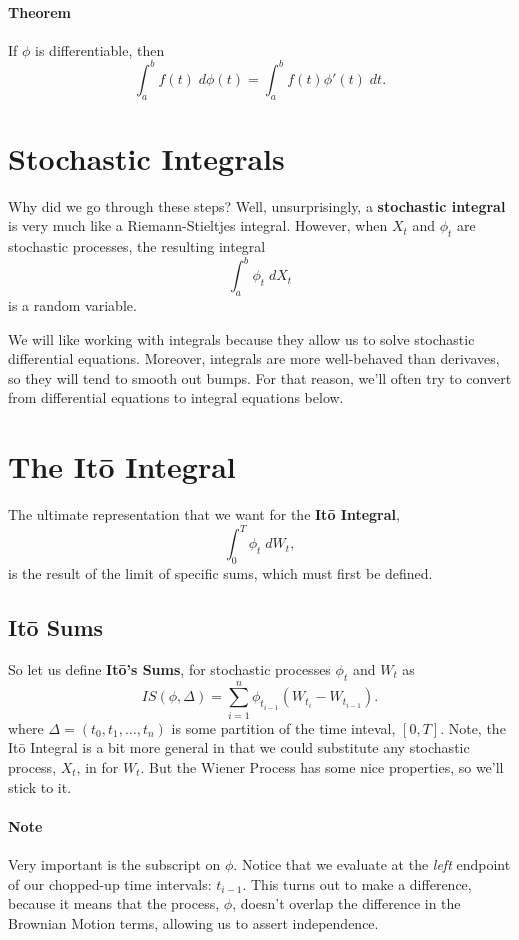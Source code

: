 \documentclass[a4paper,12pt]{scrartcl}
\begin{document}
\paragraph{Theorem} If $\phi$ is differentiable, then
   \[ \int_a^b f(t)\; d\phi(t) = \int^b_a f(t) \phi'(t) \;dt.\]

\section{Stochastic Integrals}

Why did we go through these steps? Well, unsurprisingly, a 
\textbf{stochastic integral} is very much like a Riemann-Stieltjes
integral.  However, when $X_t$ and $\phi_t$ are stochastic processes,
the resulting integral
   \[ \int^b_a \phi_t\; dX_t \]
is a random variable.

We will like working with integrals because they allow us to solve
stochastic differential equations. Moreover, integrals are more
well-behaved than derivaves, so they will tend to smooth out bumps. For
that reason, we'll often try to convert from differential equations
to integral equations below.

\section{The It\={o} Integral}

The ultimate representation that we want for the \textbf{It\={o}
Integral}, 
   \[ \int_0^T \phi_t \;dW_t, \]
is the result of the limit of specific sums, which must first be defined.

\subsection{It\={o} Sums}

So let us define \textbf{It\={o}'s Sums}, for stochastic processes
$\phi_t$ and $W_t$ as
   \[ IS(\phi,\Delta)=\sum^n_{i=1} \phi_{t_{i-1}}(W_{t_i}-W_{t_{i-1}}).\]
where $\Delta = (t_0, t_1,\ldots,t_n)$ is some partition of the time 
inteval, $[0,T]$. Note, the It\={o} Integral 
is a bit more general in that we
could substitute any stochastic process, $X_t$, in for $W_t$.  But 
the Wiener Process has some nice properties, so we'll stick to it.

\paragraph{Note} Very important is the subscript on $\phi$.  Notice that
we evaluate at the \emph{left} endpoint of our chopped-up time 
intervals: $t_{i-1}$.  This turns out to make a difference, because it
means that the process, $\phi$, doesn't overlap the difference in the 
Brownian Motion terms, allowing us to assert independence.
\end{document}
